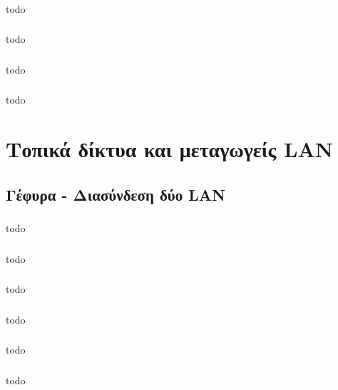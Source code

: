 \documentclass[a4paper, 12pt]{article}
\begin{document}
		\subsubsection{}
			todo

		\subsubsection{}
			todo

		\subsubsection{}
			todo

		\subsubsection{}
			todo

\section{Τοπικά δίκτυα και μεταγωγείς LAN}
	
	\subsection{Γέφυρα - Διασύνδεση δύο LAN}
	
		\subsubsection{}
			todo
	
		\subsubsection{}
			todo
			
		\subsubsection{}
			todo
			
		\subsubsection{}
			todo
			
		\subsubsection{}
			todo
			
		\subsubsection{}
			todo
\end{document}
